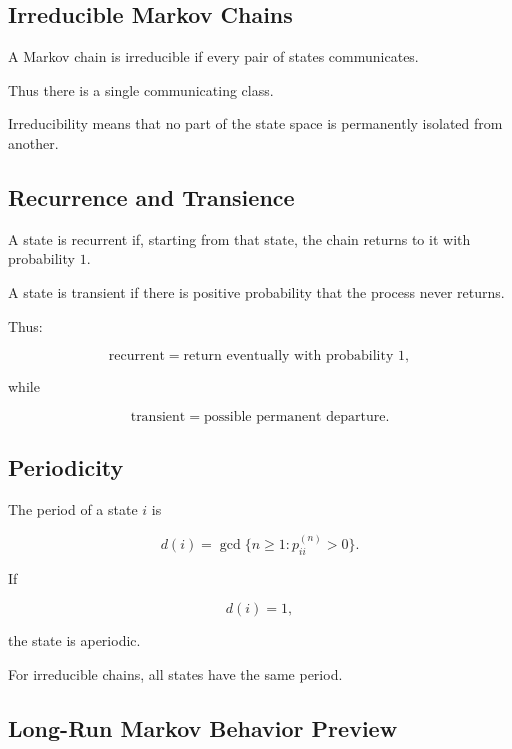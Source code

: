 \subsection{Irreducible Markov Chains}
\label{subsec:irreducible-markov-chain}

A Markov chain is irreducible if every pair of states communicates.

Thus there is a single communicating class.

Irreducibility means that no part of the state space is permanently
isolated from another.

\subsection{Recurrence and Transience}
\label{subsec:recurrence-transience}

A state is recurrent if, starting from that state, the chain returns to
it with probability \(1\).

A state is transient if there is positive probability that the process
never returns.

Thus:

\[
\boxed{
\text{recurrent}
=
\text{return eventually with probability }1,
}
\]

while

\[
\boxed{
\text{transient}
=
\text{possible permanent departure}.
}
\]

\subsection{Periodicity}
\label{subsec:markov-periodicity}

The period of a state \(i\) is

\[
\boxed{
d(i)
=
\gcd
\{
n\geq1:
p_{ii}^{(n)}>0
\}.
}
\]

If

\[
d(i)=1,
\]

the state is aperiodic.

For irreducible chains, all states have the same period.

\subsection{Long-Run Markov Behavior Preview}
\label{subsec:markov-long-run-behavior}

